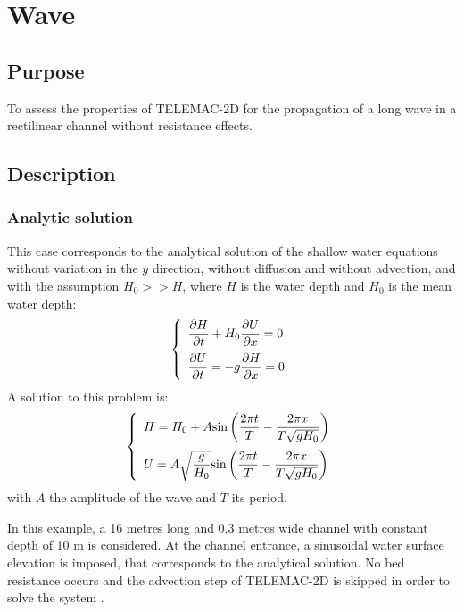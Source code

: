 \chapter{Wave}

\section{Purpose}
To assess the properties of TELEMAC-2D for the propagation of a long
wave in a rectilinear channel without resistance effects.
\section{Description}

\subsection{Analytic solution}
This case corresponds to the analytical solution of the shallow water equations
without variation in the $y$ direction, without diffusion and without advection, and
with the assumption $H_0 >> H$, where $H$ is the water depth and $H_0$ is the mean water depth:
\begin{equation}\label{eq:wave-system}
    \left\{\begin{array}{l}
    \dfrac{\partial H}{\partial t} + H_0 \dfrac{\partial U}{\partial x}=0\medskip\\
    \dfrac{\partial U}{\partial t} = -g \dfrac{\partial H}{\partial x}=0
  \end{array}\right.
\end{equation}
A solution to this problem is:
\begin{equation}
    \left\{\begin{array}{l}
    H = H_0 + A\text{sin}\left(\dfrac{2\pi t}{T} - \dfrac{2\pi x}{T\sqrt{gH_0}}\right)\medskip\\
    U = A\sqrt{\dfrac{g}{H_0}} \text{sin}\left(\dfrac{2\pi t}{T} - \dfrac{2\pi x}{T\sqrt{gH_0}}\right)
  \end{array}\right.
\end{equation}
with $A$ the amplitude of the wave and $T$ its period.

In this example, a 16 metres long and 0.3 metres wide channel with constant depth
of 10 m is considered. At the channel entrance, a sinusoïdal water surface
elevation is imposed, that corresponds to the analytical solution.
No bed resistance occurs and the advection step of TELEMAC-2D is skipped in order
to solve the system \label{eq:wave-system}.
